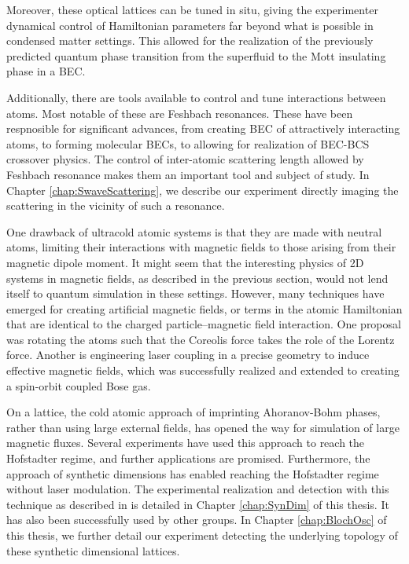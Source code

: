 Moreover, these optical lattices can be tuned in situ, giving the experimenter dynamical control of Hamiltonian parameters far beyond what is possible in condensed matter settings. This allowed for the realization of the previously predicted \cite{Fisher1989} quantum phase transition from the superfluid to the Mott insulating phase in a BEC\cite{Greiner2002,Mun2008}.

Additionally, there are tools available to control and tune interactions between atoms. Most notable of these are Feshbach resonances\cite{Fano1935,Fano1961,Feshbach1958,Feshbach1962,Chin10}. These have been respnosible for significant advances, from creating BEC of attractively interacting atoms\cite{Cornish00}, to forming molecular BECs\cite{Jochim03,Zwierlein03,Regal04}, to allowing for realization of BEC-BCS crossover physics\cite{Greiner03,Bourdel04, Regal04}. The control of inter-atomic scattering length allowed by Feshbach resonance makes them an important tool and subject of study. In Chapter \ref{chap:SwaveScattering}, we describe our experiment directly imaging the scattering in the vicinity of such a resonance. 

One drawback of ultracold atomic systems is that they are made with neutral atoms, limiting their interactions with magnetic fields to those arising from their magnetic dipole moment. It might seem that the interesting physics of 2D systems in magnetic fields, as described in the previous section, would not lend itself to quantum simulation in these settings. However, many techniques have emerged for creating artificial magnetic fields, or terms in the atomic Hamiltonian that are identical to the charged particle--magnetic field interaction. One proposal was rotating the atoms such that the Coreolis force takes the role of the Lorentz force\cite{Cooper2008}. Another is engineering laser coupling in a precise geometry to induce effective magnetic fields\cite{Juzeliunas2006}, which was successfully realized\cite{Lin2009b} and extended to creating a spin-orbit coupled Bose gas\cite{Lin2011}. 

On a lattice, the cold atomic approach of imprinting Ahoranov-Bohm phases, rather than using large external fields, has opened the way for simulation of large magnetic fluxes\cite{Jaksch2003,Mueller2004,Sorensen2005}. Several experiments have used this approach to reach the Hofstadter regime\cite{Aidelsburger2013,Miyake2013,Jotzu2014,Aidelsburger2014,Mancini2015,An2017}, and further applications are promised\cite{Mazza2012}. Furthermore, the approach of synthetic dimensions\cite{Celi2014} has enabled reaching the Hofstadter regime without laser modulation. The experimental realization and detection with this technique as described in\cite{Stuhl2015} is detailed in Chapter \ref{chap:SynDim} of this thesis. It has also been successfully used by other groups\cite{Mancini2015,Meier2016}. In Chapter \ref{chap:BlochOsc} of this thesis, we further detail our experiment detecting the underlying topology of these synthetic dimensional lattices. 


